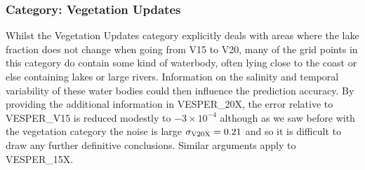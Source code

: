 \documentclass[hess, twostagejnl]{copernicus}
\begin{document}
%


\subsubsection{Category: Vegetation Updates}
Whilst the Vegetation Updates category explicitly deals with areas where the lake fraction does not change when going from V15 to V20, many of the grid points in this category do contain some kind of waterbody, often lying close to the coast or else containing lakes or large rivers. Information on the salinity and temporal variability of these water bodies could then influence the prediction accuracy. By providing the additional information in VESPER\_20X, the error relative to  VESPER\_V15 is reduced modestly to $-3 \times 10^{-4}$ although as we saw before with the vegetation category the noise is large $\sigma_{\rm V20X} = 0.21$ and so it is difficult to draw any further definitive conclusions. Similar arguments apply to VESPER\_15X.
\end{document}
